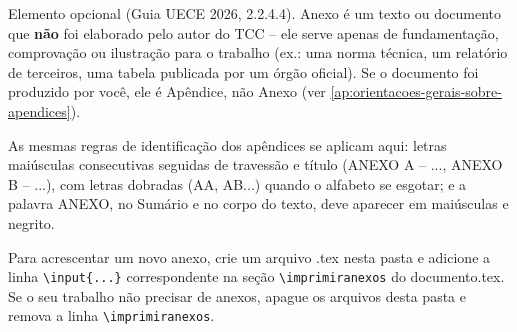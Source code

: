 \label{an:orientacoes-gerais-sobre-anexos}

Elemento opcional (Guia UECE 2026, 2.2.4.4). Anexo é um texto ou documento que \textbf{não} foi elaborado pelo autor do TCC -- ele serve apenas de fundamentação, comprovação ou ilustração para o trabalho (ex.: uma norma técnica, um relatório de terceiros, uma tabela publicada por um órgão oficial). Se o documento foi produzido por você, ele é Apêndice, não Anexo (ver \autoref{ap:orientacoes-gerais-sobre-apendices}).

As mesmas regras de identificação dos apêndices se aplicam aqui: letras maiúsculas consecutivas seguidas de travessão e título (ANEXO A -- ..., ANEXO B -- ...), com letras dobradas (AA, AB...) quando o alfabeto se esgotar; e a palavra ANEXO, no Sumário e no corpo do texto, deve aparecer em maiúsculas e negrito.

Para acrescentar um novo anexo, crie um arquivo .tex nesta pasta e adicione a linha \texttt{\textbackslash input\{...\}} correspondente na seção \texttt{\textbackslash imprimiranexos} do documento.tex. Se o seu trabalho não precisar de anexos, apague os arquivos desta pasta e remova a linha \texttt{\textbackslash imprimiranexos}.
